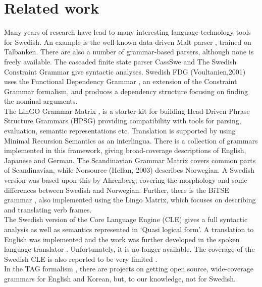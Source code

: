 \documentclass[10pt, a4paper]{article}
\begin{document}
\section{Related work}
Many years of research have lead to many interesting language
technology tools for Swedish.
An example is the well-known data-driven Malt parser \cite{malt},
trained on Talbanken. 
There are also a number of grammar-based parsers, although none is freely available.
The cascaded finite state parser CassSwe \cite{casswe} and
The Swedish Constraint Grammar \cite{birn}
give syntactic analyses. 
Swedish FDG (Voultanien,2001) uses the Functional Dependency Grammar
\cite{fdg},
an extension of the Constraint Grammar
formalism, and produces a dependency structure focusing on finding the nominal
arguments. \\

The LinGO Grammar Matrix \cite{matrix}, is a starter-kit for building
Head-Driven Phrase Structure Grammars \cite{hpsg} (HPSG) providing
compatibility with tools for parsing, evaluation, semantic representations etc.
Translation is supported by using Minimal Recursion
Semantics \cite{mrs} as an interlingua. 
There is a collection of grammars implemented in this framework, giving broad-coverage
descriptions of 
English, Japanese and German. 
The Scandinavian Grammar Matrix \cite{scandmatrix} covers common parts of
Scandinavian, while Norsource (Hellan, 2003) describes Norwegian. A Swedish version
was based upon this by Ahrenberg, covering the morphology and some
differences between Swedish and Norwegian. Further, there is the BiTSE 
grammar \cite{stymne}, also implemented using the Lingo Matrix,
which focuses on describing and translating verb frames.\\ 


The Swedish version of the Core Language Engine (CLE) \cite{gamback}
gives a full syntactic analysis as well as semantics represented in `Quasi logical form'. A
translation to English  was implemented and the work was further developed in the spoken
language translator \cite{spoken}. Unfortunately, it is no longer available. The coverage of the Swedish
CLE is also reported to be very limited \cite[p. 134]{nivreTrees}.\\

In the TAG formalism \cite{tag}, there are projects on getting open source, wide-coverage grammars
for English and Korean, but, to our knowledge, not for Swedish.  \\
\end{document}
